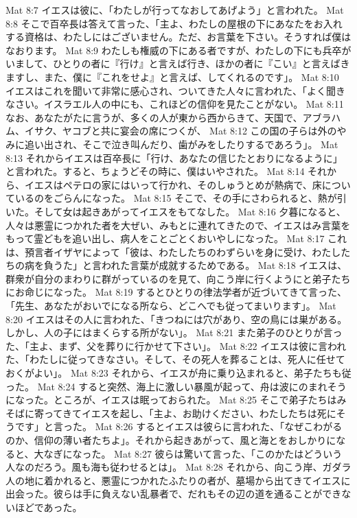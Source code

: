 Mat 8:7  イエスは彼に、「わたしが行ってなおしてあげよう」と言われた。
Mat 8:8  そこで百卒長は答えて言った、「主よ、わたしの屋根の下にあなたをお入れする資格は、わたしにはございません。ただ、お言葉を下さい。そうすれば僕はなおります。
Mat 8:9  わたしも権威の下にある者ですが、わたしの下にも兵卒がいまして、ひとりの者に『行け』と言えば行き、ほかの者に『こい』と言えばきますし、また、僕に『これをせよ』と言えば、してくれるのです」。
Mat 8:10  イエスはこれを聞いて非常に感心され、ついてきた人々に言われた、「よく聞きなさい。イスラエル人の中にも、これほどの信仰を見たことがない。
Mat 8:11  なお、あなたがたに言うが、多くの人が東から西からきて、天国で、アブラハム、イサク、ヤコブと共に宴会の席につくが、
Mat 8:12  この国の子らは外のやみに追い出され、そこで泣き叫んだり、歯がみをしたりするであろう」。
Mat 8:13  それからイエスは百卒長に「行け、あなたの信じたとおりになるように」と言われた。すると、ちょうどその時に、僕はいやされた。
Mat 8:14  それから、イエスはペテロの家にはいって行かれ、そのしゅうとめが熱病で、床についているのをごらんになった。
Mat 8:15  そこで、その手にさわられると、熱が引いた。そして女は起きあがってイエスをもてなした。
Mat 8:16  夕暮になると、人々は悪霊につかれた者を大ぜい、みもとに連れてきたので、イエスはみ言葉をもって霊どもを追い出し、病人をことごとくおいやしになった。
Mat 8:17  これは、預言者イザヤによって「彼は、わたしたちのわずらいを身に受け、わたしたちの病を負うた」と言われた言葉が成就するためである。
Mat 8:18  イエスは、群衆が自分のまわりに群がっているのを見て、向こう岸に行くようにと弟子たちにお命じになった。
Mat 8:19  するとひとりの律法学者が近づいてきて言った、「先生、あなたがおいでになる所なら、どこへでも従ってまいります」。
Mat 8:20  イエスはその人に言われた、「きつねには穴があり、空の鳥には巣がある。しかし、人の子にはまくらする所がない」。
Mat 8:21  また弟子のひとりが言った、「主よ、まず、父を葬りに行かせて下さい」。
Mat 8:22  イエスは彼に言われた、「わたしに従ってきなさい。そして、その死人を葬ることは、死人に任せておくがよい」。
Mat 8:23  それから、イエスが舟に乗り込まれると、弟子たちも従った。
Mat 8:24  すると突然、海上に激しい暴風が起って、舟は波にのまれそうになった。ところが、イエスは眠っておられた。
Mat 8:25  そこで弟子たちはみそばに寄ってきてイエスを起し、「主よ、お助けください、わたしたちは死にそうです」と言った。
Mat 8:26  するとイエスは彼らに言われた、「なぜこわがるのか、信仰の薄い者たちよ」。それから起きあがって、風と海とをおしかりになると、大なぎになった。
Mat 8:27  彼らは驚いて言った、「このかたはどういう人なのだろう。風も海も従わせるとは」。
Mat 8:28  それから、向こう岸、ガダラ人の地に着かれると、悪霊につかれたふたりの者が、墓場から出てきてイエスに出会った。彼らは手に負えない乱暴者で、だれもその辺の道を通ることができないほどであった。
